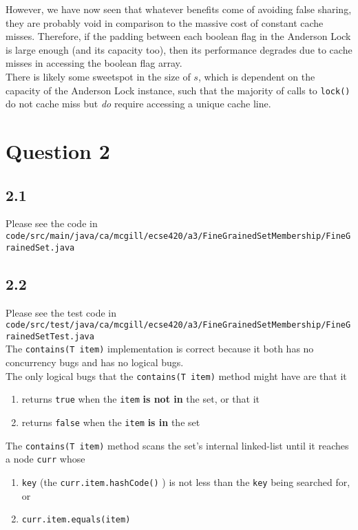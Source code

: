 \documentclass[11pt, letterpaper]{article}
\newcommand{\code}[1] { \texttt{#1} }
\begin{document}
However, we have now seen that whatever benefits come of avoiding false sharing, they are probably void in comparison to the massive cost of constant cache misses. Therefore, if the padding between each boolean flag in the Anderson Lock is large enough (and its capacity too), then its performance degrades due to cache misses in accessing the boolean flag array.\\

There is likely some sweetspot in the size of $s$, which is dependent on the capacity of the Anderson Lock instance, such that the majority of calls to \code{lock()} do not cache miss but \textit{do} require accessing a unique cache line.

\newpage
\section*{Question 2}
\subsection*{2.1}
Please see the code in\\

\texttt{code/src/main/java/ca/mcgill/ecse420/a3/FineGrainedSetMembership/FineGrainedSet.java}

\subsection*{2.2}
Please see the test code in\\

\texttt{code/src/test/java/ca/mcgill/ecse420/a3/FineGrainedSetMembership/FineGrainedSetTest.java}\\

The \code{contains(T item)} implementation is correct because it both has no concurrency bugs and has no logical bugs.\\

The only logical bugs that the \code{contains(T item)} method might have are that it

\begin{enumerate}
    \item returns \code{true} when the \code{item} \textbf{is not in} the set, or that it
    \item returns \code{false} when the \code{item} \textbf{is in} the set
\end{enumerate}

The \code{contains(T item)} method scans the set's internal linked-list until it reaches a node \code{curr} whose
\begin{enumerate}
    \item \code{key} (the \code{curr.item.hashCode()}) is not less than the \code{key} being searched for, or
    \item \code{curr.item.equals(item)}
\end{enumerate}
\end{document}
